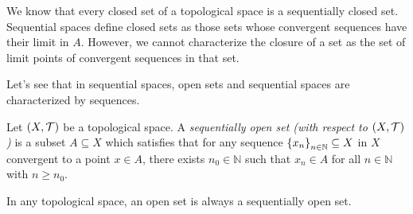 \begin{remark}
  We know that every closed set of a topological space is a sequentially closed set. Sequential spaces define closed sets as those sets whose convergent sequences have their limit in $A$. However, we cannot characterize the closure of a set as the set of limit points of convergent sequences in that set.
\end{remark}

Let's see that in sequential spaces, open sets and sequential spaces are characterized by sequences.

\begin{definition}
  Let $\left(X,\mathcal{T}\right)$ be a topological space. A \textit{sequentially open set (with respect to $\left(X,\mathcal{T}\right)$)} is a subset $A\subseteq X$ which satisfies that for any sequence $\left\{x_n\right\}_{n\in\mathbb{N}}\subseteq X$ in $X$ convergent to a point $x\in A$, there exists $n_0\in\mathbb{N}$ such that $x_n\in A$ for all $n\in\mathbb{N}$ with $n\geq n_0$.
\end{definition}

\begin{remark}
  In any topological space, an open set is always a sequentially open set.
\end{remark}

